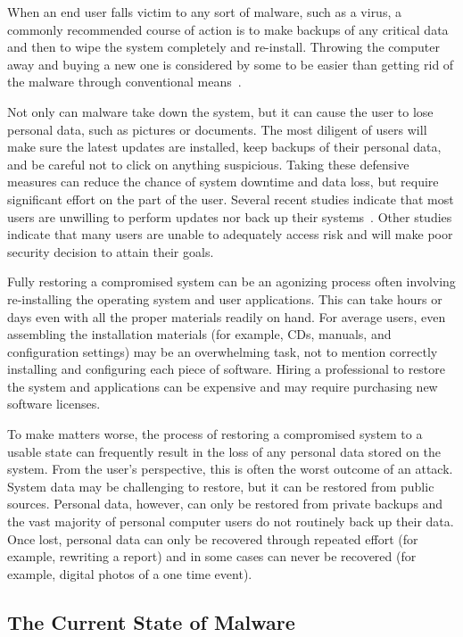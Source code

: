 When an end user falls victim to any sort of malware, such as a virus, a commonly recommended course of action is to make backups of any critical data and then to wipe the system completely and re-install. Throwing the computer away and buying a new one is considered by some to be easier than getting rid of the malware through conventional means~\cite{NewYork_Times_2005, KOMU-TV_2010}.

Not only can malware take down the system, but it can cause the user to lose personal data, such as pictures or documents. The most diligent of users will make sure the latest updates are installed, keep backups of their personal data, and be careful not to click on anything suspicious. Taking these defensive measures can reduce the chance of system downtime and data loss, but require significant effort on the part of the user. Several recent studies indicate that most users are unwilling to perform updates nor back up their systems~\cite{ Acronis_2009, The_Register_2009, Microsoft_TechNet_2010}. Other studies indicate that many users are unable to adequately access risk and will make poor security decision to attain their goals\cite{sunshine_wolf_2009, motiee_chi_2010}.

Fully restoring a compromised system can be an agonizing process often involving re-installing the operating system and user applications. This can take hours or days even with all the proper materials readily on hand. For average users, even assembling the installation materials (for example, CDs, manuals, and configuration settings) may be an overwhelming task, not to mention correctly installing and configuring each piece of software. Hiring a professional to restore the system and applications can be expensive and may require purchasing new software licenses.
 
To make matters worse, the process of restoring a compromised system to a usable state can frequently result in the loss of any personal data stored on the system. From the user's perspective, this is often the worst outcome of an attack. System data may be challenging to restore, but it can be restored from public sources. Personal data, however, can only be restored from private backups and the vast majority of personal computer users do not routinely back up their data. Once lost, personal data can only be recovered through repeated effort (for example, rewriting a report) and in some cases can never be recovered (for example, digital photos of a one time event).

\subsection{The Current State of Malware}

